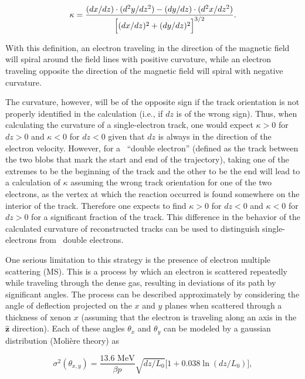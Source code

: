 \documentclass{JINST}
\begin{document}
\begin{equation}\label{eqn_curv}
\kappa = \frac{(dx/dz)\cdot(d^2y/dz^2) - (dy/dz)\cdot(d^2x/dz^2)}{\Bigl[(dx/dz)^2 + (dy/dz)^2\Bigr]^{3/2}}.
\end{equation}

With this definition, an electron traveling in the direction of the magnetic field will spiral around the field lines with positive curvature, while an electron traveling opposite the direction of the magnetic field will spiral with negative curvature.  

The curvature, however, will be of the opposite sign if the track orientation is not properly identified in the calculation (i.e., if $dz$ is of the wrong sign).  Thus, when calculating the curvature of a single-electron track, one would expect $\kappa > 0$ for $dz > 0$ and $\kappa < 0$ for $dz < 0$ given that $dz$ is always in the direction of the electron velocity.  However, for a \bbonu\ ``double electron'' (defined as the track between the two blobs that mark the start and end of the trajectory), taking one of the extremes to be the beginning of the track and the other to be the end will lead to a calculation of $\kappa$ assuming the wrong track orientation for one of the two electrons, as the vertex at which the reaction occurred is found somewhere on the interior of the track.  Therefore one expects to find $\kappa > 0$ for $dz < 0$ and $\kappa < 0$ for $dz > 0$ for a significant fraction of the track.  This difference in the behavior of the calculated curvature of reconstructed tracks can be used to distinguish single-electrons from \bbonu\ double electrons.

One serious limitation to this strategy is the presence of electron multiple scattering (MS). This is a process by 
which an electron is scattered repeatedly while traveling through the dense gas, resulting in deviations of its
path by significant angles. The process can be described approximately by considering the angle of deflection projected on the $x$ and $y$ planes when scattered through a thickness of xenon $x$ (assuming that the electron is traveling along an axis in the $\hat{\mathbf{z}}$ direction). Each of these angles $\theta_x$ and $\theta_y$ can be modeled by a gaussian distribution (Moli\`{e}re theory) as

\begin{equation}\label{eqn_mscat}
\sigma^{2}(\theta_{x,y}) = \frac{13.6\,\,\mathrm{MeV}}{\beta p}\sqrt{dz/L_{0}}\bigl[1 + 0.038\ln(dz/L_{0})\bigr],
\end{equation}
\end{document}
